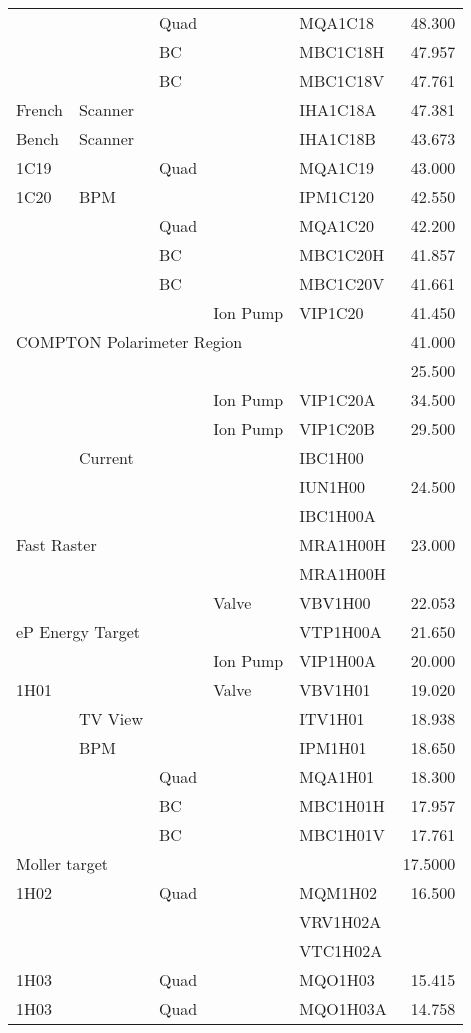 \begin{longtable}[hpt]{lllllr}
&& Quad && MQA1C18 & 48.300 \\
&& BC && MBC1C18H & 47.957 \\
&& BC && MBC1C18V & 47.761 \\ \hline
French & Scanner &&& IHA1C18A & 47.381 \\
Bench & Scanner &&& IHA1C18B & 43.673 \\ \hline
1C19 && Quad && MQA1C19 & 43.000 \\
1C20 & BPM &&& IPM1C120 & 42.550 \\
&& Quad && MQA1C20 & 42.200 \\
&& BC && MBC1C20H & 41.857 \\
&& BC && MBC1C20V & 41.661 \\
&&& Ion Pump & VIP1C20 & 41.450 \\ \hline
\multicolumn{5}{l}{COMPTON Polarimeter Region} & 41.000 \\
& &&&& 25.500 \\
&&& Ion Pump & VIP1C20A & 34.500 \\
&&& Ion Pump & VIP1C20B & 29.500 \\ \hline
& Current &&& IBC1H00 & \\
&&&& IUN1H00 & 24.500 \\
&&&& IBC1H00A & \\
\multicolumn{2}{l}{Fast Raster} &&& MRA1H00H & 23.000 \\ 
&&&& MRA1H00H & \\ 
&&& Valve & VBV1H00 & 22.053 \\
\multicolumn{2}{l}{eP Energy Target} &&& VTP1H00A & 21.650 \\
&&& Ion Pump & VIP1H00A & 20.000 \\
1H01 &&& Valve & VBV1H01 & 19.020 \\
& TV View &&& ITV1H01 & 18.938 \\
& BPM &&& IPM1H01 & 18.650 \\
&& Quad && MQA1H01 & 18.300 \\
&& BC && MBC1H01H & 17.957 \\
&& BC && MBC1H01V & 17.761 \\ 
\hline
\multicolumn{2}{l}{Moller target} &&&& 17.5000 \\
1H02 && Quad && MQM1H02 & 16.500 \\
&&&& VRV1H02A \\
&&&& VTC1H02A \\
1H03 && Quad && MQO1H03 & 15.415 \\
1H03 && Quad && MQO1H03A & 14.758 \\

\end{longtable}
